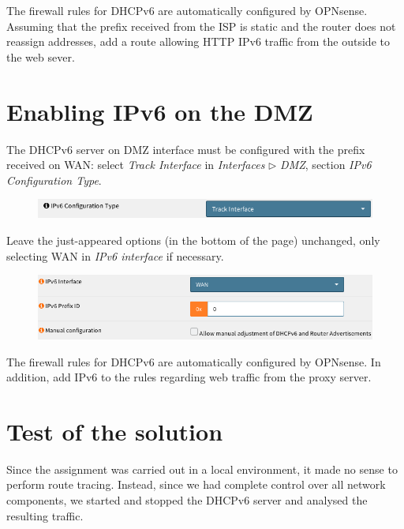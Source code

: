 \documentclass[draft]{homework}
\newcommand{\dhcp}{DHCPv6\xspace}
\newcommand{\ip}{IPv6\xspace}
\newcommand{\opn}{OPNsense\xspace}
\begin{document}
    The firewall rules for \dhcp are automatically configured by \opn.
    Assuming that the prefix received from the ISP is static and the router does not reassign addresses, add a route allowing HTTP \ip traffic from the outside to the web sever.
    
    
    \section{Enabling \ip on the DMZ}
    The \dhcp server on DMZ interface must be configured with the prefix received on WAN: select \textit{Track Interface} in \textit{Interfaces} $\triangleright$ \textit{DMZ}, section \textit{\ip Configuration Type}.
    \begin{figure}[H]
        \centering
        \includegraphics[width=\linewidth]{images/dmz-ipv6}
        \label{fig:dmz-ipv6}
    \end{figure}
    \vspace{-15pt}
    
    Leave the just-appeared options (in the bottom of the page) unchanged, only selecting WAN in \textit{\ip interface} if necessary.
    \begin{figure}[H]
        \centering
        \includegraphics[width=\linewidth]{images/dmz-track}
        \label{fig:dmz-track}
    \end{figure}
    \vspace{-25pt}
    
    The firewall rules for \dhcp are automatically configured by \opn.
    In addition, add \ip to the rules regarding web traffic from the proxy server.
    
    
    \section{Test of the solution}
    Since the assignment was carried out in a local environment, it made no sense to perform route tracing.
    Instead, since we had complete control over all network components, we started and stopped the \dhcp server and analysed the resulting traffic.
    
\end{document}
